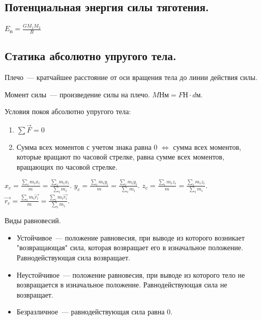 \documentclass{article}
\begin{document}
	\subsection{Потенциальная энергия силы тяготения.}
	$E_{\text{п}} = \frac{GM_1M_2}{R}$
	\subsection{Статика абсолютно упругого тела.}
	\begin{definition}
		Плечо~--- кратчайшее расстояние от оси вращения тела до линии действия силы.
	\end{definition}
	\begin{definition}
		Момент силы~--- произведение силы на плечо. $M \text{Нм} = F \text{Н} \cdot d \text{м}$.
	\end{definition}
	\begin{definition}
		Условия покоя абсолютно упругого тела:
		\begin{enumerate}
			\item $\sum \vec{F} = 0$
			\item Сумма всех моментов с учетом знака равна $0$ $\Leftrightarrow$ сумма всех моментов, которые вращают по часовой стрелке, равна сумме всех моментов, вращающих по часовой стрелке.
		\end{enumerate}
	\end{definition}
	\begin{definition}
		$x_c = \frac{\sum\limits_i m_i x_i}{m} = \frac{\sum\limits_i m_i x_i}{\sum\limits_i m_i}$. $y_c = \frac{\sum\limits_i m_i y_i}{m} = \frac{\sum\limits_i m_i y_i}{\sum\limits_i m_i}$. $z_c = \frac{\sum\limits_i m_i z_i}{m} = \frac{\sum\limits_i m_i z_i}{\sum\limits_i m_i}$. $\vec{r_c} = \frac{\sum\limits_i m_i \vec{r_i}}{m} = \frac{\sum\limits_i m_i \vec{r_i}}{\sum\limits_i m_i}$.
	\end{definition}
	\begin{definition}
		Виды равновесий.
		\begin{itemize}
			\item Устойчивое~--- положение равновесия, при выводе из которого возникает "возвращающая" сила, которая возвращает его в изначальное положение. Равнодействующая сила возвращает.
			\item Неустойчивое~--- положение равновесия, при выводе из которого тело не возвращается в изначальное положение. Равнодействующая сила не возвращает.
			\item Безразличное~--- равнодействующая сила равна $0$.
		\end{itemize}
	\end{definition}
\end{document}
